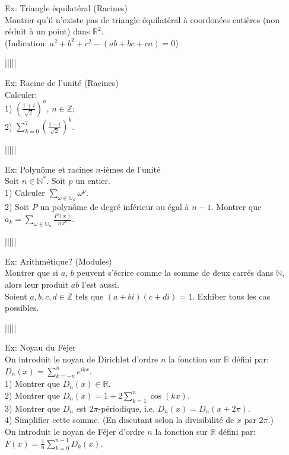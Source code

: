 \documentclass{article}
\begin{document}
Ex: Triangle \'equilat\'eral (Racines)\\
Montrer qu'il n'existe pas de triangle \'equilat\'eral \`a coordon\'ees enti\`eres (non r\'eduit \`a un point) dans $\mathbb{R}^2$.\\
(Indication: $a^2+b^2+c^2-(ab+bc+ca)=0$)
\begin{center}
|||||
\end{center}
Ex: Racine de l'unit\'e (Racines)\\
Calculer:\\
1) $(\frac{1+i}{\sqrt{2}})^n$, $n\in\mathbb{Z}$;\\
2) $\sum\limits_{k=0}^{7}(\frac{1-i}{\sqrt{2}})^k$.
\begin{center}
|||||
\end{center}
Ex: Polyn\^ome et racines $n$-i\`emes de l'unit\'e\\
Soit $n\in\mathbb{N^*}$. Soit $p$ un entier.\\
1) Calculer $\sum\limits_{\omega\in\mathbb{U}_n}\omega^p$.\\
2) Soit $P$ un polyn\^ome de degr\'e inf\'erieur ou \'egal \`a $n-1$. Montrer que $a_k=\sum\limits_{\omega\in\mathbb{U}_n}\frac{P(x)}{nx^k}$.
\begin{center}
|||||
\end{center}
Ex: Arithm\'etique? (Modules)\\
Montrer que si $a$, $b$ peuvent s'\'ecrire comme la somme de deux carr\'es dans $\mathbb{N}$, alors leur produit $ab$ l'est aussi.\\
Soient $a,b,c,d\in\mathbb{Z}$ tels que $(a+bi)(c+di)=1$. Exhiber tous les cas possibles.
\begin{center}
|||||
\end{center}
Ex: Noyau du F\'ejer\\
On introduit le noyau de Dirichlet d'ordre $n$ la fonction sur $\mathbb{R}$ d\'efini par: $D_n(x)=\sum\limits_{k=-n}^{n}e^{ikx}$.\\
1) Montrer que $D_n(x)\in\mathbb{R}$.\\
2) Montrer que $D_n(x)=1+2\sum\limits_{k=1}^{n}\cos(kx)$.\\
3) Montrer que $D_n$ est $2\pi$-p\'eriodique, i.e. $D_n(x)=D_n(x+2\pi)$.\\
4) Simplifier cette somme. (En discutant selon la divisibilit\'e de $x$ par $2\pi$.)\\
On introduit le noyan de F\'ejer d'ordre $n$ la fonction sur $\mathbb{R}$ d\'efini par: $F(x)=\frac{1}{n}\sum\limits_{k=0}^{n-1}D_k(x)$.\\
\end{document}
